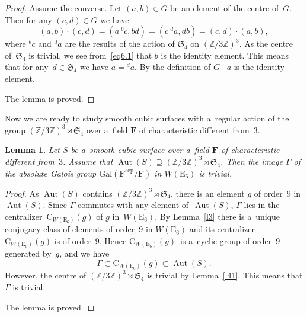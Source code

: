 \documentclass{amsart}
\numberwithin{equation}{section}
\theoremstyle{plain}
\newtheorem{lemma}{Lemma}
\theoremstyle{definition}
\theoremstyle{remark}
\begin{document}
\begin{proof}
Assume the converse. Let $(a,b) \in G$ be an element of the centre of~$G$. Then for any $(c,d) \in G$ we have
\begin{equation}
\label{eq6.1}
(a,b) \cdot (c,d)=(a \ {}^b c,bd)=(c\ {}^d a,db)=(c,d)\cdot (a,b),
\end{equation}
where ${}^b{c}$ and ${}^d{a}$ are the results of the action of $\mathfrak{S}_4$ 
 on $(\mathbb{Z}/3\mathbb{Z})^3$. As the centre of~$\mathfrak{S}_4$ is trivial, we see from~\eqref{eq6.1} that $b$ is the identity element. This means that for any~\mbox{$d \in \mathfrak{S}_4$} we have $a={}^d{a}$. By the definition of $G$ \ $a$ is the identity element.

The lemma is proved.
\end{proof}

Now we are ready to study smooth cubic surfaces with a~regular action of the group $(\mathbb{Z}/3\mathbb{Z})^3 \rtimes \mathfrak{S}_4$ over a~field $\mathbf{F}$ of characteristic different from~$3$.

\begin{lemma}
\label{l42}
Let $S$ be a~smooth cubic surface over a~field $\mathbf{F}$ of characteristic different from~$3$. Assume that $\operatorname{Aut}(S) \supseteq (\mathbb{Z}/3\mathbb{Z})^3 \rtimes \mathfrak{S}_4$. Then the image $\Gamma$ of the absolute Galois group $\mathrm{Gal}(\mathbf{F}^{\mathrm{sep}}/\mathbf{F})$ in $W(\mathrm{E}_6)$ is trivial.
\end{lemma}

\begin{proof}
As $\operatorname{Aut}(S)$ contains $(\mathbb{Z}/3\mathbb{Z})^3 \rtimes \mathfrak{S}_4$, there is an element $g$ of order~$9$ in $\operatorname{Aut}(S)$. Since $\Gamma$ commutes with any element of~$\operatorname{Aut}(S)$, $\Gamma$ lies in the centralizer~$\mathrm{C}_{W(\mathrm{E}_6)}(g)$ of $g$ in~$W(\mathrm{E}_6)$. By Lemma~\ref{l3} there is a~unique conjugacy class of elements of order~$9$ in $W(\mathrm{E}_6)$ and its centralizer~$\mathrm{C}_{W(\mathrm{E}_6)}(g)$ is of order~$9$. Hence $\mathrm{C}_{W(\mathrm{E}_6)}(g)$~is a~cyclic group of order~$9$ generated by~$g$, and we have
$$
\Gamma \subset \mathrm{C}_{W(\mathrm{E}_6)}(g) \subset \operatorname{Aut}(S).
$$
However, the centre of $(\mathbb{Z}/3\mathbb{Z})^3 \rtimes \mathfrak{S}_4$ is trivial by Lemma~\ref{l41}. This means that $\Gamma$ is trivial.

The lemma is proved.
\end{proof}
\end{document}
